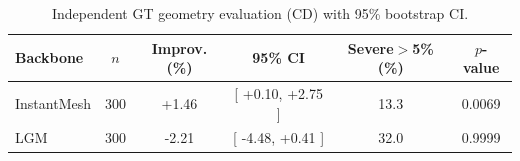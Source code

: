 \begin{table}[t]
  \centering
  \caption{Independent GT geometry evaluation (CD) with 95\% bootstrap CI.}
  \label{tab:proxy_gap_closure}
  \begin{tabular}{lccccc}
    \toprule
    Backbone & $n$ & Improv.(\%) & 95\% CI & Severe$>$5\%(\%) & $p$-value \\
    \midrule
    InstantMesh & 300 & +1.46 & [ +0.10, +2.75 ] & 13.3 & 0.0069 \\
    LGM         & 300 & -2.21 & [ -4.48, +0.41 ] & 32.0 & 0.9999 \\
    \bottomrule
  \end{tabular}
\end{table}
